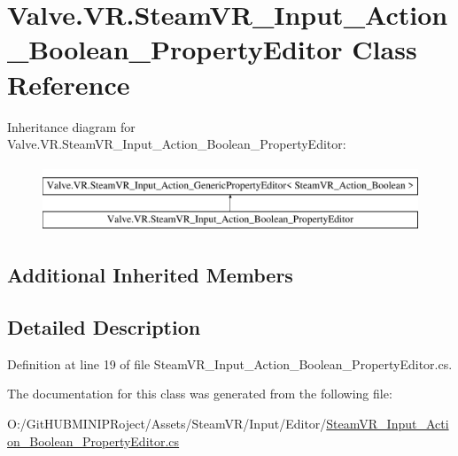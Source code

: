 \hypertarget{class_valve_1_1_v_r_1_1_steam_v_r___input___action___boolean___property_editor}{}\section{Valve.\+V\+R.\+Steam\+V\+R\+\_\+\+Input\+\_\+\+Action\+\_\+\+Boolean\+\_\+\+Property\+Editor Class Reference}
\label{class_valve_1_1_v_r_1_1_steam_v_r___input___action___boolean___property_editor}
Inheritance diagram for Valve.\+V\+R.\+Steam\+V\+R\+\_\+\+Input\+\_\+\+Action\+\_\+\+Boolean\+\_\+\+Property\+Editor\+:\begin{figure}[H]
\begin{center}
\leavevmode
\includegraphics[height=2.000000cm]{class_valve_1_1_v_r_1_1_steam_v_r___input___action___boolean___property_editor}
\end{center}
\end{figure}
\subsection*{Additional Inherited Members}


\subsection{Detailed Description}


Definition at line 19 of file Steam\+V\+R\+\_\+\+Input\+\_\+\+Action\+\_\+\+Boolean\+\_\+\+Property\+Editor.\+cs.



The documentation for this class was generated from the following file\+:\begin{DoxyCompactItemize}
\item 
O\+:/\+Git\+H\+U\+B\+M\+I\+N\+I\+P\+Roject/\+Assets/\+Steam\+V\+R/\+Input/\+Editor/\mbox{\hyperlink{_steam_v_r___input___action___boolean___property_editor_8cs}{Steam\+V\+R\+\_\+\+Input\+\_\+\+Action\+\_\+\+Boolean\+\_\+\+Property\+Editor.\+cs}}\end{DoxyCompactItemize}
